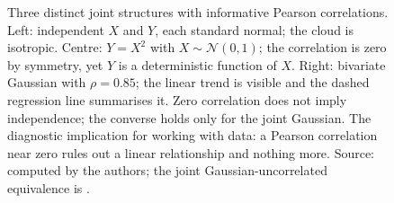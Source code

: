 \begin{figure}[htbp]
\begin{tikzpicture}[x=1cm, y=1cm, font=\small]
\end{tikzpicture}
\caption[Independence, zero correlation, and linear dependence]{Three
distinct joint structures with informative Pearson correlations.
Left: independent $X$ and $Y$, each standard normal; the cloud is
isotropic. Centre: $Y = X^{2}$ with $X \sim \mathcal{N}(0, 1)$; the
correlation is zero by symmetry, yet $Y$ is a deterministic
function of $X$. Right: bivariate Gaussian with $\rho = 0.85$; the
linear trend is visible and the dashed regression line summarises
it. Zero correlation does not imply independence; the converse
holds only for the joint Gaussian. The diagnostic implication for
working with data: a Pearson correlation near zero rules out a
linear relationship and nothing more. Source: computed by the
authors; the joint Gaussian-uncorrelated equivalence is
\cite[ch.~4]{text:wasserman2004}.}
\label{fig:vol02:ch13:independence-correlation}
\end{figure}
